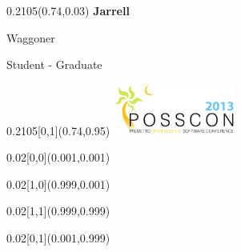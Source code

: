 \documentclass[a4paper]{article}
\begin{document}
\begin{textblock}{0.2105}(0.74,0.03)
  {\fontsize{36}{40} \textbf{Jarrell} } \\
  \begin{Large} Waggoner \end{Large}

  \vspace{2em}

  Student - Graduate
\end{textblock}

\begin{textblock}{0.2105}[0,1](0.74,0.95)
  \includegraphics[width=4cm]{fig/logo}
\end{textblock}


\begin{textblock}{0.02}[0,0](0.001,0.001)
\end{textblock}

\begin{textblock}{0.02}[1,0](0.999,0.001)
\end{textblock}

\begin{textblock}{0.02}[1,1](0.999,0.999)
\end{textblock}

\begin{textblock}{0.02}[0,1](0.001,0.999)
\end{textblock}

\end{document}
